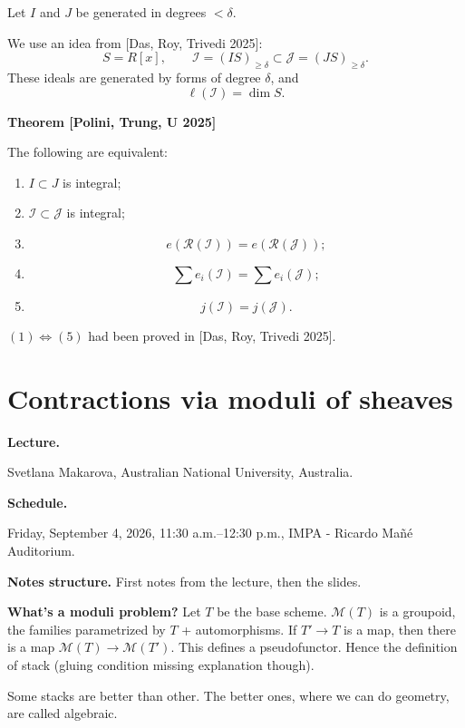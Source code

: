 Let $I$ and $J$ be generated in degrees
$<\delta$.

We use an idea from
[Das, Roy, Trivedi 2025]:
$$
S=R[x],
\qquad
\mathcal{I}=(IS)_{\geq\delta}
\subset
\mathcal{J}=(JS)_{\geq\delta}.
$$
These ideals are generated by forms of
degree $\delta$, and
$$
\ell(\mathcal{I})=\dim S.
$$

\medskip\noindent
{\bf Theorem [Polini, Trung, U 2025]}

The following are equivalent:
\begin{enumerate}
\item[(1)]
$I\subset J$ is integral;

\item[(2)]
$\mathcal{I}\subset\mathcal{J}$ is
integral;

\item[(3)]
$$
e(\mathcal{R}(\mathcal{I}))
=
e(\mathcal{R}(\mathcal{J}));
$$

\item[(4)]
$$
\sum e_i(\mathcal{I})
=
\sum e_i(\mathcal{J});
$$

\item[(5)]
$$
j(\mathcal{I})=j(\mathcal{J}).
$$
\end{enumerate}

$(1)\Longleftrightarrow(5)$ had been
proved in [Das, Roy, Trivedi 2025].

\section{Contractions via moduli of sheaves}
\label{section-contractions-moduli-sheaves}

\medskip\noindent
{\bf Lecture.}

Svetlana Makarova,
Australian National University,
Australia.

\medskip\noindent
{\bf Schedule.}

Friday, September 4, 2026,
11:30 a.m.--12:30 p.m.,
IMPA - Ricardo Ma\~n\'e Auditorium.

\medskip\noindent
{\bf Notes structure.} First notes from
the lecture, then the slides.


\medskip\noindent
{\bf What's a moduli problem?} 
Let $T$ be the base scheme.
$\mathcal{M}(T)$ is a groupoid, the families
parametrized by $T $ + automorphisms.
If $T' \to T$ is a map, then there is a
map $\mathcal{M}(T) \to \mathcal{M}(T')$.
This defines a pseudofunctor. 
Hence the definition of stack (gluing
condition missing explanation though).

Some stacks are better than other.
The better ones, where we can do geometry,
are called algebraic.

